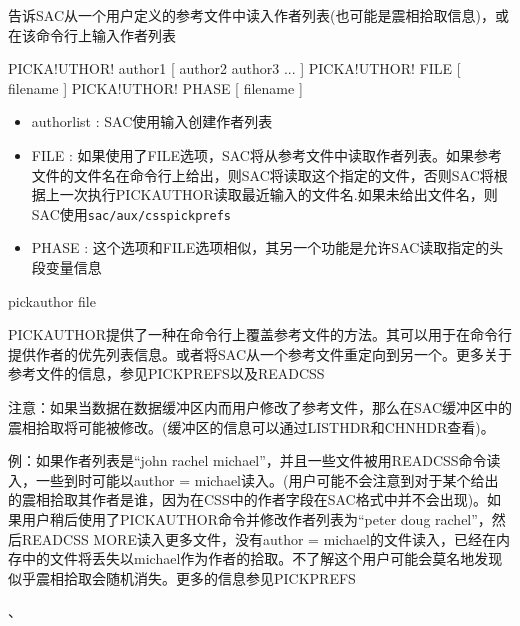 \label{cmd:pickauthor}

告诉SAC从一个用户定义的参考文件中读入作者列表(也可能是震相拾取信息)，或在该命令行上输入作者列表

\begin{SACSTX}
PICKA!UTHOR! author1 [ author2 author3 ... ]
PICKA!UTHOR! FILE [ filename ]
PICKA!UTHOR! PHASE [ filename ]
\end{SACSTX}

\begin{itemize}
\item authorlist : SAC使用输入创建作者列表 
\item FILE : 如果使用了FILE选项，SAC将从参考文件中读取作者列表。如果参考文件的文件名在命令行上给出，则SAC将读取这个指定的文件，否则SAC将根据上一次执行PICKAUTHOR读取最近输入的文件名.如果未给出文件名，则SAC使用\texttt{sac/aux/csspickprefs}
\item PHASE : 这个选项和FILE选项相似，其另一个功能是允许SAC读取指定的头段变量信息 
\end{itemize}

\begin{SACDFT}
pickauthor file
\end{SACDFT}

PICKAUTHOR提供了一种在命令行上覆盖参考文件的方法。其可以用于在命令行提供作者的优先列表信息。或者将SAC从一个参考文件重定向到另一个。更多关于参考文件的信息，参见PICKPREFS以及READCSS

注意：如果当数据在数据缓冲区内而用户修改了参考文件，那么在SAC缓冲区中的震相拾取将可能被修改。(缓冲区的信息可以通过LISTHDR和CHNHDR查看)。

例：如果作者列表是``john rachel michael''，并且一些文件被用READCSS命令读入，一些到时可能以author = michael读入。(用户可能不会注意到对于某个给出的震相拾取其作者是谁，因为在CSS中的作者字段在SAC格式中并不会出现)。如果用户稍后使用了PICKAUTHOR命令并修改作者列表为``peter doug rachel''，然后READCSS MORE读入更多文件，没有author = michael的文件读入，已经在内存中的文件将丢失以michael作为作者的拾取。不了解这个用户可能会莫名地发现似乎震相拾取会随机消失。更多的信息参见PICKPREFS

、
